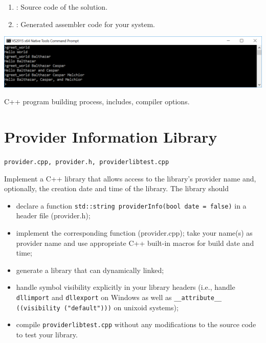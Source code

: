 \documentclass{cgsblatt}
\begin{document}
\begin{enumerate}
	\item {} : Source code of the solution.
	\item {} : Generated assembler code for your system.
\end{enumerate}


\hspace{\leftmargin}\includegraphics[width=\linewidth-\leftmargin]{greet_world}

C++ program building process, includes, compiler options. 



\section{Provider Information Library}

\lstinline|provider.cpp, provider.h, providerlibtest.cpp|

Implement a C++ library that allows access to the library's provider name 
and, optionally, the creation date and time of the library. 
The library should 

\begin{itemize}\setlength{\parskip}{4pt}

\item declare a function \lstinline|std::string providerInfo(bool date = false)|
in a header file (provider.h); 
\item implement the corresponding function (provider.cpp); take your name(s) as provider name and use appropriate C++ built-in macros for build date and time;
\item generate a library that can dynamically linked;
\item handle symbol visibility explicitly in your library headers (i.e., handle \lstinline|dllimport| and \lstinline|dllexport| on Windows as well as \lstinline|__attribute__ ((visibility ("default")))| on unixoid systems);
\item compile \lstinline|providerlibtest.cpp| without any modifications to the source code to test your library. 

\end{itemize}
\end{document}
